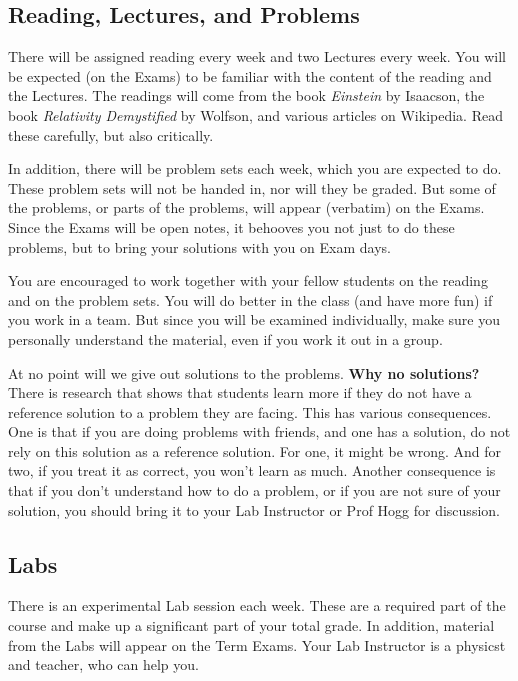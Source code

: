 \documentclass[12pt]{article}
\begin{document}
\subsection*{Reading, Lectures, and Problems}

There will be assigned reading every week and two Lectures every week.
You will be expected (on the Exams) to be familiar with the content of
the reading and the Lectures.
The readings will come from the book \textit{Einstein} by Isaacson,
the book \textit{Relativity Demystified} by Wolfson,
and various articles on Wikipedia.
Read these carefully, but also critically.

In addition, there will be problem sets each week, which you are
expected to do.
These problem sets will not be handed in, nor will they be graded.
But some of the problems, or parts of the problems, will appear
(verbatim) on the Exams.
Since the Exams will be open notes, it behooves you not just to do
these problems, but to bring your solutions with you on Exam days.

You are encouraged to work together with your fellow students on the
reading and on the problem sets.
You will do better in the class (and have more fun) if you work in a
team.
But since you will be examined individually, make sure you personally
understand the material, even if you work it out in a group.

At no point will we give out solutions to the problems. \textbf{Why no
  solutions?} There is research that shows that students learn more if
they do not have a reference solution to a problem they are
facing. This has various consequences. One is that if you are doing
problems with friends, and one has a solution, do not rely on this
solution as a reference solution. For one, it might be wrong. And for
two, if you treat it as correct, you won't learn as much. Another
consequence is that if you don't understand how to do a problem, or if
you are not sure of your solution, you should bring it to your Lab
Instructor or Prof Hogg for discussion.

\subsection*{Labs}

There is an experimental Lab session each week. These are a required
part of the course and make up a significant part of your total grade.
In addition, material from the Labs will appear on the Term Exams.
Your Lab Instructor is a physicst and teacher, who can help you.
\end{document}
